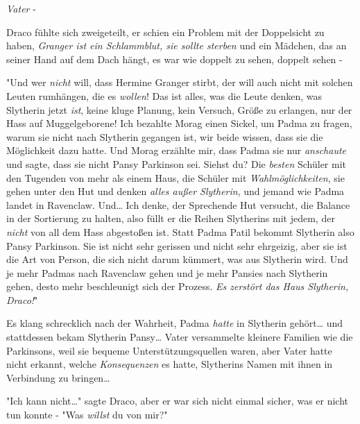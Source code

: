 {\emph{Vater} -

Draco fühlte sich zweigeteilt, er schien ein Problem mit der Doppelsicht zu haben, \emph{Granger ist ein Schlammblut, sie sollte sterben} und ein Mädchen, das an seiner Hand auf dem Dach hängt, es war wie doppelt zu sehen, doppelt sehen -

"Und wer \emph{nicht} will, dass Hermine Granger stirbt, der will auch nicht mit solchen Leuten rumhängen, die es \emph{wollen}! Das ist alles, was die Leute denken, was Slytherin jetzt \emph{ist}, keine kluge Planung, kein Versuch, Größe zu erlangen, nur der Hass auf Muggelgeborene! Ich bezahlte Morag einen Sickel, um Padma zu fragen, warum sie nicht nach Slytherin gegangen ist, wir beide wissen, dass sie die Möglichkeit dazu hatte. Und Morag erzählte mir, dass Padma sie nur \emph{anschaute} und sagte, dass sie nicht Pansy Parkinson sei. Siehst du? Die \emph{besten} Schüler mit den Tugenden von mehr als einem Haus, die Schüler mit \emph{Wahlmöglichkeiten}, sie gehen unter den Hut und denken \emph{alles außer Slytherin}, und jemand wie Padma landet in Ravenclaw. Und… Ich denke, der Sprechende Hut versucht, die Balance in der Sortierung zu halten, also füllt er die Reihen Slytherins mit jedem, der \emph{nicht} von all dem Hass abgestoßen ist. Statt Padma Patil bekommt Slytherin also Pansy Parkinson. Sie ist nicht sehr gerissen und nicht sehr ehrgeizig, aber sie ist die Art von Person, die sich nicht darum kümmert, was aus Slytherin wird. Und je mehr Padmas nach Ravenclaw gehen und je mehr Pansies nach Slytherin gehen, desto mehr beschleunigt sich der Prozess. \emph{Es zerstört das Haus Slytherin, Draco!}"

Es klang schrecklich nach der Wahrheit, Padma \emph{hatte} in Slytherin gehört… und stattdessen bekam Slytherin Pansy… Vater versammelte kleinere Familien wie die Parkinsons, weil sie bequeme Unterstützungsquellen waren, aber Vater hatte nicht erkannt, welche \emph{Konsequenzen} es hatte, Slytherins Namen mit ihnen in Verbindung zu bringen…

"Ich kann nicht…" sagte Draco, aber er war sich nicht einmal sicher, was er nicht tun konnte - "Was \emph{willst} du von mir?"

}
